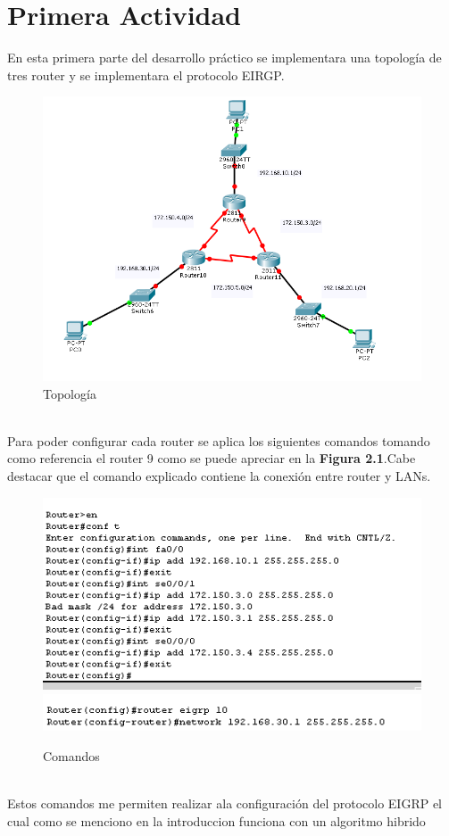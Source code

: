 \documentclass[spanish]{udpreport}
\begin{document}
\section{Primera Actividad}
En esta primera parte del desarrollo práctico se implementara una topología de tres router y se implementara el protocolo EIRGP.\\
\begin{figure}[h]
    \centering
    \includegraphics[scale=0.4]{images/11.png}
    \caption{Topología}
    \label{fig:my_label}
\end{figure}
\\
Para poder configurar cada router se aplica los siguientes comandos tomando como referencia el router 9 como se puede apreciar en la \textbf{Figura 2.1}.Cabe destacar que el comando explicado contiene la conexión entre router y LANs.
\begin{figure}[h]
    \centering
    \includegraphics[scale=0.4]{images/22.png}
    \includegraphics[scale=0.5]{images/112.png}
    \caption{Comandos}
    \label{fig:my_label}
\end{figure}
\\ Estos comandos me permiten realizar ala configuración del protocolo EIGRP el cual como se menciono en la introduccion funciona con un algoritmo hibrido
\end{document}
